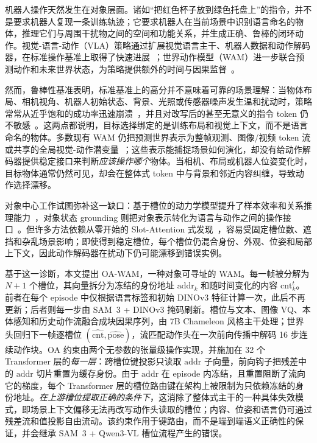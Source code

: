\documentclass{article}
\newcommand{\method}{OA-WAM}
\begin{document}
机器人操作天然发生在对象层面。诸如“把红色杯子放到绿色托盘上”的指令，并不是要求机器人复现一条训练轨迹；它要求机器人在当前场景中识别语言命名的物体，推理它们与周围干扰物之间的空间和功能关系，并生成正确、鲁棒的闭环动作。视觉-语言-动作（VLA）策略通过扩展视觉语言主干、机器人数据和动作解码器，在标准操作基准上取得了快速进展~\citep{rt2,openvla,pi05}；世界动作模型（WAM）进一步联合预测动作和未来世界状态，为策略提供额外的时间与因果监督~\citep{rynnvla002,adaworldpolicy,dreamzero}。

然而，鲁棒性基准表明，标准基准上的高分并不意味着可靠的场景理解：当物体布局、相机视角、机器人初始状态、背景、光照或传感器噪声发生温和扰动时，策略常常从近乎饱和的成功率迅速崩溃~\citep{liberoplus,colosseum,robustvla}，并且对改写后的甚至无意义的指令 token 仍不敏感~\citep{liberoplus,liberopro}。这两点都说明，目标选择绑定的是训练布局和视觉上下文，而不是语言命名的物体。多数现有 WAM 仍把预测世界表示为整帧观测、图像/视频 token 流或共享的全局视觉-动作潜变量~\citep{uwm,worldvla,cotvla}；这些表示能捕捉场景如何演化，却没有给动作解码器提供稳定接口来判断\emph{应该操作哪个}物体。当相机、布局或机器人位姿变化时，目标物体通常仍然可见，却会在整体式 token 中与背景和邻近内容纠缠，导致动作选择漂移。

对象中心工作试图弥补这一缺口：基于槽位的动力学模型提升了样本效率和关系推理能力~\citep{focus,ocwm}，对象状态 grounding 则把对象表示转化为语言与动作之间的操作接口~\citep{goalvla,slotvla,lilovla}。但许多方法依赖从零开始的 Slot-Attention 式发现~\citep{slotattention,slotformer,slotdiffusion}，容易受固定槽位数、遮挡和杂乱场景影响；即使得到稳定槽位，每个槽位仍混合身份、外观、位姿和局部上下文，因此动作解码器在扰动下仍可能漂移到错误实例。

基于这一诊断，本文提出 \method{}，一种对象可寻址的 WAM。每一帧被分解为 $N{+}1$ 个槽位，其向量拆分为冻结的身份地址 $\mathrm{addr}_k$ 和随时间变化的内容 $\mathrm{cnt}_k^t$。前者在每个 episode 中仅根据语言标签和初始 DINOv3 特征计算一次，此后不再更新；后者则每一步由 SAM~3 + DINOv3 掩码刷新。槽位与文本、图像 VQ、本体感知和历史动作流融合成块因果序列，由 7B Chameleon 风格主干处理；世界头回归下一帧逐槽位 $(\hat{\mathrm{cnt}},\hat{\mathrm{pose}})$，流匹配动作头在一次前向传播中解码 16 步连续动作块。OA 约束由两个无参数的张量级操作实现，并施加在 32 个 Transformer 层的\emph{每一层}：跨槽位键投影只读取 $\mathrm{addr}$ 子向量，前向钩子把残差中的 $\mathrm{addr}$ 切片重置为缓存身份。由于 $\mathrm{addr}$ 在 episode 内冻结，且重置阻断了流向它的梯度，每个 Transformer 层的槽位路由键在架构上被限制为只依赖冻结的身份地址。\emph{在上游槽位提取正确的条件下}，这消除了整体式主干的一种具体失效模式，即场景上下文偏移无法再改写动作头读取的槽位；内容、位姿和语言仍可通过残差流和值投影自由流动。该约束作用于键路由，而不是端到端语义正确性的保证，并会继承 SAM~3 + Qwen3-VL 槽位流程产生的错误。
\end{document}
